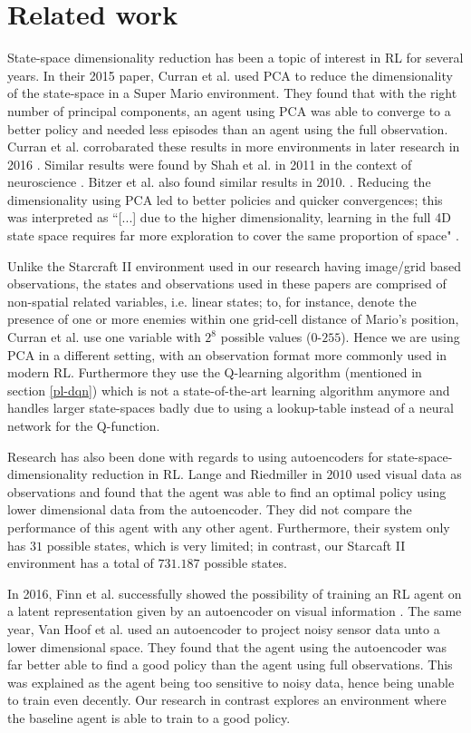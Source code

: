 \chapter{Related work}\label{relatedwork}
State-space dimensionality reduction has been a topic of interest in RL for several years. In their 2015 paper, Curran et al. \cite{mario} used PCA to reduce the dimensionality of the state-space in a Super Mario environment. They found that with the right number of principal components, an agent using PCA was able to converge to a better policy and needed less episodes than an agent using the full observation. Curran et al. corrobarated these results in more environments in later research in 2016 \cite{pca_curran}. Similar results were found by Shah et al. in 2011 in the context of neuroscience \cite{pca_neural}. Bitzer et al. also found similar results in 2010. \cite{pca_bitzer}. Reducing the dimensionality using PCA led to better policies and quicker convergences; this was interpreted as ``[...] due to the higher dimensionality, learning in the full 4D state space requires far more exploration to cover the same proportion of space" \cite{pca_bitzer}.

Unlike the Starcraft II environment used in our research having image/grid based observations, the states and observations used in these papers are comprised of non-spatial related variables, i.e. linear states; to, for instance, denote the presence of one or more enemies within one grid-cell distance of Mario's position, Curran et al. use one variable with $2^8$ possible values ($0$-$255$). Hence we are using PCA in a different setting, with an observation format more commonly used in modern RL. Furthermore they use the Q-learning algorithm (mentioned in section \ref{pl-dqn}) which is not a state-of-the-art learning algorithm anymore and handles larger state-spaces badly due to using a lookup-table instead of a neural network for the Q-function.

Research has also been done with regards to using autoencoders for state-space-dimensionality reduction in RL. Lange and Riedmiller in 2010 \cite{AE_2010} used visual data as observations and found that the agent was able to find an optimal policy using lower dimensional data from the autoencoder. They did not compare the performance of this agent with any other agent. Furthermore, their system only has $31$ possible states, which is very limited; in contrast, our Starcaft II environment has a total of $731.187$ possible states. 

In 2016, Finn et al. successfully showed the possibility of training an RL agent on a latent representation given by an autoencoder on visual information \cite{ae_visual}. The same year, Van Hoof et al. \cite{AE_2016} used an autoencoder to project noisy sensor data unto a lower dimensional space. They found that the agent using the autoencoder was far better able to find a good policy than the agent using full observations. This was explained as the agent being too sensitive to noisy data, hence being unable to train even decently. Our research in contrast explores an environment where the baseline agent is able to train to a good policy.

